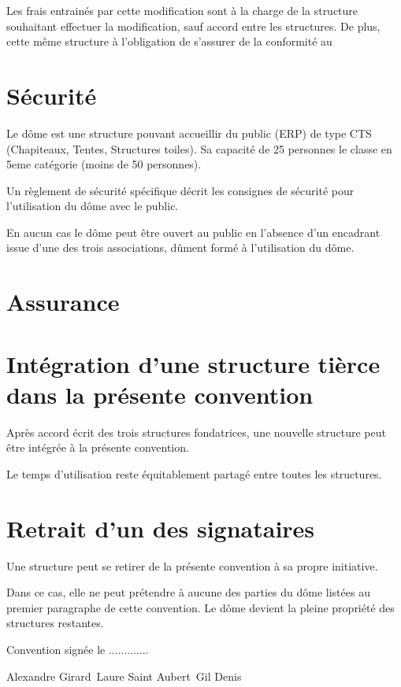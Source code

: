 \documentclass[a4paper,12pt]{article}
\newcommand{\presidentplasci}{Gil Denis}
\newcommand{\presidentincognu}{Laure Saint Aubert}
\newcommand{\presidenttetalab}{Alexandre Girard}
\begin{document}
Les frais entrainés par cette modification sont à la charge de la structure
souhaitant effectuer la  modification, sauf accord entre les structures. De
plus, cette même structure à l'obligation de s'assurer de la conformité au 

\section{Sécurité}

Le dôme est une structure pouvant accueillir du public (ERP) de type CTS
(Chapiteaux, Tentes, Structures toiles). Sa capacité de 25 personnes le classe
en 5eme catégorie (moins de 50 personnes).

Un règlement de sécurité spécifique décrit les consignes de sécurité pour
l'utilisation du dôme avec le public.

En aucun cas le dôme peut être ouvert au public en l'absence d'un encadrant
issue d'une des trois associations, dûment formé à l'utilisation du dôme.

\section{Assurance}


\section{Intégration d'une structure tièrce dans la présente convention}

Après accord écrit des trois structures fondatrices, une nouvelle structure
peut être intégrée à la présente convention.

Le temps d'utilisation reste équitablement partagé entre toutes les structures.

\section{Retrait d'un des signataires}

Une structure peut se retirer de la présente convention à sa propre initiative.

Dans ce cas, elle ne peut prétendre à aucune des parties du dôme listées au
premier paragraphe de cette convention. Le dôme devient la pleine propriété des
structures restantes.

Convention signée le .............

\presidenttetalab~\presidentincognu~\presidentplasci
\end{document}
